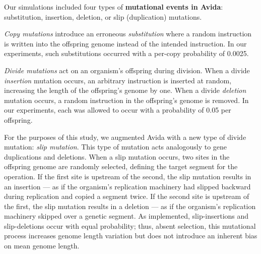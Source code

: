 Our simulations included four types of \textbf{mutational events in Avida}: substitution, insertion, deletion, or slip (duplication) mutations.

\textit{Copy mutations} introduce an erroneous \textit{substitution} where a random instruction is written into the offspring genome instead of the intended instruction.
In our experiments, such substitutions occurred with a per-copy probability of 0.0025.

\textit{Divide mutations} act on an organism's offspring during division.
When a divide \textit{insertion} mutation occurs, an arbitrary instruction is inserted at random, increasing the length of the offspring's genome by one.
When a divide \textit{deletion} mutation occurs, a random instruction in the offspring's genome is removed.
In our experiments, each was allowed to occur with a probability of 0.05 per offspring.

For the purposes of this study, we augmented Avida with a new type of divide mutation: \textit{slip mutation}.
This type of mutation acts analogously to gene duplications and deletions.
When a slip mutation occurs, two sites in the offspring genome are randomly selected, defining the target segment for the operation.
If the first site is upstream of the second, the slip mutation results in an insertion --- as if the organism's replication machinery had slipped backward during replication and copied a segment twice.
If the second site is upstream of the first, the slip mutation results in a deletion --- as if the organism's replication machinery skipped over a genetic segment.
As implemented, slip-insertions and slip-deletions occur with equal probability; thus, absent selection, this mutational process increases genome length variation but does not introduce an inherent bias on mean genome length.

